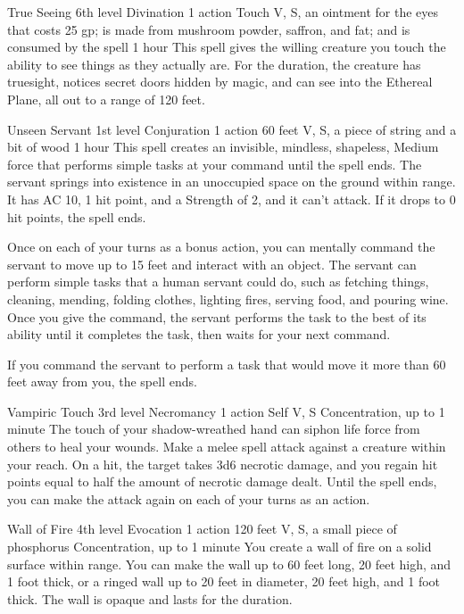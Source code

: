 \documentclass[10pt,a4paper,twoside,bg=print,twocolumn,openany,nodeprecatedcode]{dndbook}
\begin{document}


\DndSpellHeader%
{True Seeing}
{6th level Divination}
{1 action}
{Touch}
{V, S, an ointment for the eyes that costs 25 gp; is made from mushroom powder, saffron, and fat; and is consumed by the spell}
{1 hour}
This spell gives the willing creature you touch the ability to see things as they actually are. For the duration, the creature has truesight, notices secret doors hidden by magic, and can see into the Ethereal Plane, all out to a range of 120 feet.



\DndSpellHeader%
{Unseen Servant}
{1st level Conjuration}
{1 action}
{60 feet}
{V, S, a piece of string and a bit of wood}
{1 hour}
This spell creates an invisible, mindless, shapeless, Medium force that performs simple tasks at your command until the spell ends. The servant springs into existence in an unoccupied space on the ground within range. It has AC 10, 1 hit point, and a Strength of 2, and it can't attack. If it drops to 0 hit points, the spell ends.

Once on each of your turns as a bonus action, you can mentally command the servant to move up to 15 feet and interact with an object. The servant can perform simple tasks that a human servant could do, such as fetching things, cleaning, mending, folding clothes, lighting fires, serving food, and pouring wine. Once you give the command, the servant performs the task to the best of its ability until it completes the task, then waits for your next command.

If you command the servant to perform a task that would move it more than 60 feet away from you, the spell ends.



\DndSpellHeader%
{Vampiric Touch}
{3rd level Necromancy}
{1 action}
{Self}
{V, S}
{Concentration, up to 1 minute}
The touch of your shadow-wreathed hand can siphon life force from others to heal your wounds. Make a melee spell attack against a creature within your reach. On a hit, the target takes 3d6 necrotic damage, and you regain hit points equal to half the amount of necrotic damage dealt. Until the spell ends, you can make the attack again on each of your turns as an action.



\DndSpellHeader%
{Wall of Fire}
{4th level Evocation}
{1 action}
{120 feet}
{V, S, a small piece of phosphorus}
{Concentration, up to 1 minute}
You create a wall of fire on a solid surface within range. You can make the wall up to 60 feet long, 20 feet high, and 1 foot thick, or a ringed wall up to 20 feet in diameter, 20 feet high, and 1 foot thick. The wall is opaque and lasts for the duration.
\end{document}
